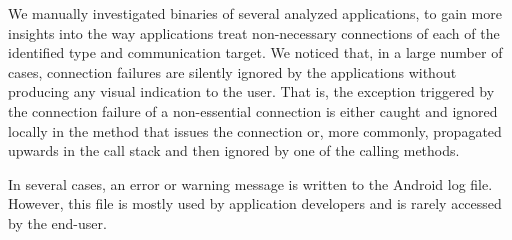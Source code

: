 We manually investigated binaries of several analyzed applications, to gain more insights into the way applications treat non-necessary connections of each of the identified type and communication target. 
We noticed that, in a large number of cases, connection failures are silently ignored by the applications without producing any visual indication to the user. 
That is, the exception triggered by the connection failure of a non-essential connection is either caught and ignored locally in the method that issues the connection or, more commonly, propagated upwards in the call stack and then ignored by one of the calling methods. 

In several cases, an error or warning message is written to the Android log file. However, this file is mostly used by  application developers and is rarely accessed by the end-user.











